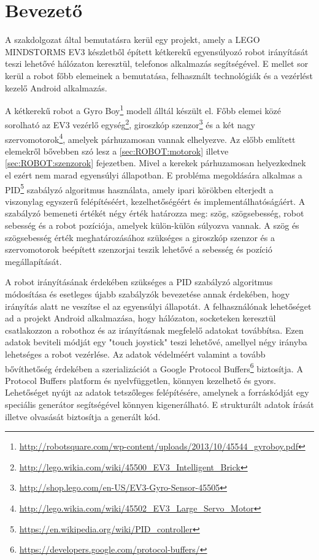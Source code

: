 \chapter{Bevezető}
A szakdolgozat által bemutatásra kerül egy projekt, amely a LEGO MINDSTORMS EV3\cite{mindstormsEv3} készletből épített kétkerekű egyensúlyozó robot irányítását teszi lehetővé hálózaton keresztül, telefonos alkalmazás segítségével. E mellet sor kerül a robot főbb elemeinek a bemutatása, felhasznált technológiák és a vezérlést kezelő Android alkalmazás.

A kétkerekű robot a Gyro Boy\footnote{\href{http://robotsquare.com/wp-content/uploads/2013/10/45544\_gyroboy.pdf}{http://robotsquare.com/wp-content/uploads/2013/10/45544\_gyroboy.pdf}} modell álltál készült el. Főbb elemei közé sorolható az EV3 vezérlő egység\footnote{\href{http://lego.wikia.com/wiki/45500\_EV3\_Intelligent\_Brick}{http://lego.wikia.com/wiki/45500\_EV3\_Intelligent\_Brick}}, giroszkóp szenzor\footnote{\href{http://shop.lego.com/en-US/EV3-Gyro-Sensor-45505}{http://shop.lego.com/en-US/EV3-Gyro-Sensor-45505}} és a két nagy szervomotorok\footnote{\href{http://lego.wikia.com/wiki/45502\_EV3\_Large\_Servo\_Motor}{http://lego.wikia.com/wiki/45502\_EV3\_Large\_Servo\_Motor}}, amelyek párhuzamosan vannak elhelyezve. Az előbb említett elemekről bővebben szó lesz a \ref{sec:ROBOT:motorok} illetve \ref{sec:ROBOT:szenzorok} fejezetben. Mivel a kerekek párhuzamosan helyezkednek el ezért nem marad egyensúlyi állapotban. E probléma megoldására alkalmas a PID\footnote{\href{https://en.wikipedia.org/wiki/PID\_controller}{https://en.wikipedia.org/wiki/PID\_controller}} szabályzó algoritmus használata, amely ipari körökben elterjedt a viszonylag egyszerű felépítéséért, kezelhetőségéért és implementálhatóságáért. A szabályzó bemeneti értékét négy érték határozza meg: szög, szögsebesség, robot sebesség és a robot pozíciója, amelyek külön-külön súlyozva vannak. A szög és szögsebesség érték meghatározásához szükséges a giroszkóp szenzor és a szervomotorok beépített szenzorjai teszik lehetővé a sebesség és pozíció megállapítását.

A robot irányításának érdekében szükséges a PID szabályzó algoritmus módosítása és esetleges újabb szabályzók bevezetése annak érdekében, hogy irányítás alatt ne veszítse el az egyensúlyi állapotát. A felhasználónak lehetőséget ad a projekt Android alkalmazása, hogy hálózaton, socketeken keresztül csatlakozzon a robothoz és az irányításnak megfelelő adatokat továbbítsa. Ezen adatok beviteli módját egy "touch joystick" teszi lehetővé, amellyel négy irányba lehetséges a robot vezérlése. Az adatok védelméért valamint a tovább bővíthetőség érdekében a szerializációt a Google Protocol Buffers\footnote{\href {https://developers.google.com/protocol-buffers/}{https://developers.google.com/protocol-buffers/}} biztosítja. A Protocol Buffers platform és nyelvfüggetlen, könnyen kezelhető és gyors. Lehetőséget nyújt az adatok tetszőleges felépítésére, amelynek a forráskódját egy speciális generátor segítségével könnyen kigenerálható. E strukturált adatok írását illetve olvasását biztosítja a generált kód.

